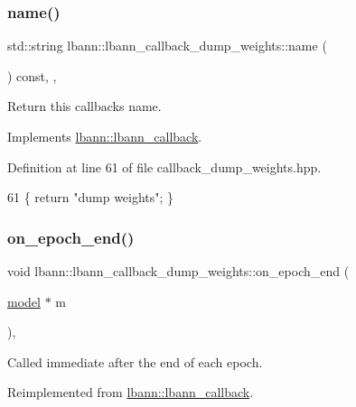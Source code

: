 \subsubsection{\texorpdfstring{name()}{name()}}
{\footnotesize\ttfamily std\+::string lbann\+::lbann\+\_\+callback\+\_\+dump\+\_\+weights\+::name (\begin{DoxyParamCaption}{ }\end{DoxyParamCaption}) const\hspace{0.3cm}{\ttfamily [inline]}, {\ttfamily [override]}, {\ttfamily [virtual]}}

Return this callback\textquotesingle{}s name. 

Implements \hyperlink{classlbann_1_1lbann__callback_a7522c7a14f1d6a1ea762cc2d7248eb3a}{lbann\+::lbann\+\_\+callback}.



Definition at line 61 of file callback\+\_\+dump\+\_\+weights.\+hpp.


\begin{DoxyCode}
61 \{ \textcolor{keywordflow}{return} \textcolor{stringliteral}{"dump weights"}; \}
\end{DoxyCode}
\mbox{\label{classlbann_1_1lbann__callback__dump__weights_aa73068d94b2408fc0124b2a05b4e2b8a}} 
\subsubsection{\texorpdfstring{on\+\_\+epoch\+\_\+end()}{on\_epoch\_end()}}
{\footnotesize\ttfamily void lbann\+::lbann\+\_\+callback\+\_\+dump\+\_\+weights\+::on\+\_\+epoch\+\_\+end (\begin{DoxyParamCaption}\item[{\hyperlink{classlbann_1_1model}{model} $\ast$}]{m }\end{DoxyParamCaption})\hspace{0.3cm}{\ttfamily [override]}, {\ttfamily [virtual]}}

Called immediate after the end of each epoch. 

Reimplemented from \hyperlink{classlbann_1_1lbann__callback_a1fc71110e7f754bf73c9e0f344a448a5}{lbann\+::lbann\+\_\+callback}.



